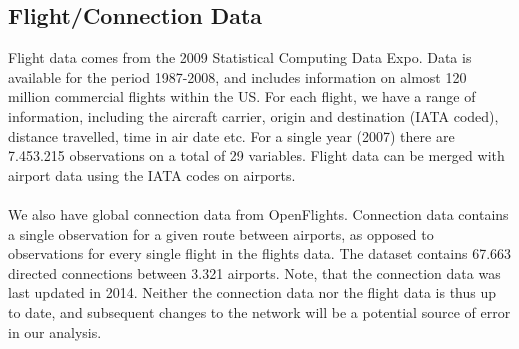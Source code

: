 \subsection{Flight/Connection Data}
\label{subsec:Flight Data}
Flight data comes from the 2009 Statistical Computing Data Expo. Data is available for the period 1987-2008, and  includes information on almost 120 million commercial flights within the US. For each flight, we have a range of information, including the aircraft carrier, origin and destination (IATA coded), distance travelled, time in air date etc. For a single year (2007) there are 7.453.215 observations on a total of 29 variables. Flight data can be merged with airport data using the IATA codes on airports. \\
\\
We also have global connection data from OpenFlights. Connection data contains a single observation for a given route between airports, as opposed to observations for every single flight in the flights data. The dataset contains 67.663 directed connections between 3.321 airports. Note, that the connection data was last updated in 2014. Neither the connection data nor the flight data is thus up to date, and subsequent changes to the network will be a potential source of error in our analysis. 


